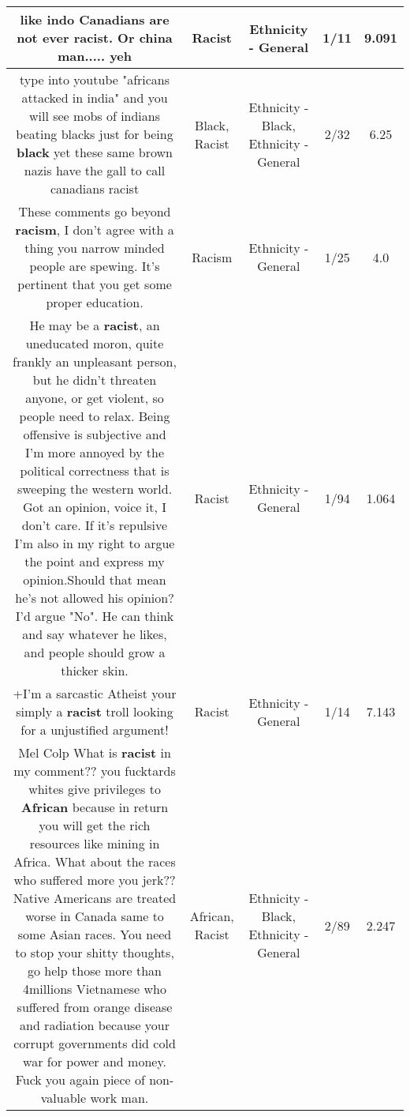 \documentclass[11pt]{article}
\newlength\mylength
\begin{document}
\begin{center}
\begin{longtable}{|C{.65\mylength}|C{.30\mylength}|C{.12\mylength}|C{.12\mylength}|C{.12\mylength}|}
  \small like indo Canadians are not ever \textbf{racist}. Or china man..... yeh\normalsize   & Racist & Ethnicity - General & 1/11 & 9.091 \\  \hline
  \small type into youtube "africans attacked in india" and you will see mobs of indians beating blacks just for being \textbf{black} yet these same brown nazis have the gall to call canadians racist\normalsize   & Black, Racist & Ethnicity - Black, Ethnicity - General & 2/32 & 6.25 \\  \hline
  \small These comments go beyond \textbf{racism}, I don't agree with a thing you narrow minded people are spewing. It's pertinent that you get some proper education.\normalsize   & Racism & Ethnicity - General & 1/25 & 4.0 \\  \hline
  \small He may be a \textbf{racist}, an uneducated moron, quite frankly an unpleasant person, but he didn't threaten anyone, or get violent, so people need to relax.  Being offensive is subjective and I'm more annoyed by the political correctness that is sweeping the western world.  Got an opinion, voice it, I don't care.  If it's repulsive I'm also in my right to argue the point and express my opinion.Should that mean he's not allowed his opinion?I'd argue "No". He can think and say whatever he likes, and people should grow a thicker skin.\normalsize   & Racist & Ethnicity - General & 1/94 & 1.064 \\  \hline
  \small +I'm a sarcastic Atheist your simply a \textbf{racist} troll looking for a unjustified argument!\normalsize   & Racist & Ethnicity - General & 1/14 & 7.143 \\  \hline
  \small Mel Colp What is \textbf{racist} in my comment?? you fucktards whites give privileges to \textbf{African} because in return you will get the rich resources like mining in Africa. What about the races who suffered more you jerk?? Native Americans are treated worse in Canada same to some Asian races. You need to stop your shitty thoughts, go help those more than 4millions Vietnamese who suffered from orange disease and radiation because your corrupt governments did cold war for power and money. Fuck you again piece of non-valuable work man.\normalsize   & African, Racist & Ethnicity - Black, Ethnicity - General & 2/89 & 2.247 \\  \hline

\end{longtable}
\end{center}
\end{document}
